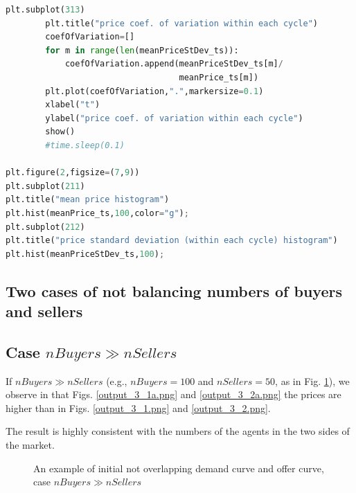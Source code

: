 \documentclass[12pt]{report}
\begin{document}
\begin{lstlisting}[language=Python, caption=The unstructured version, basicstyle=\ttfamily\footnotesize]
        plt.subplot(313)
        plt.title("price coef. of variation within each cycle")
        coefOfVariation=[]
        for m in range(len(meanPriceStDev_ts)):
            coefOfVariation.append(meanPriceStDev_ts[m]/
                                   meanPrice_ts[m])
        plt.plot(coefOfVariation,".",markersize=0.1)
        xlabel("t")
        ylabel("price coef. of variation within each cycle")
        show()
        #time.sleep(0.1)

plt.figure(2,figsize=(7,9))
plt.subplot(211)
plt.title("mean price histogram")
plt.hist(meanPrice_ts,100,color="g");
plt.subplot(212)
plt.title("price standard deviation (within each cycle) histogram")
plt.hist(meanPriceStDev_ts,100);
\end{lstlisting}




\begin{appendices}
\section{Two cases of not balancing numbers of buyers and sellers}\label{Two cases of not balancing numbers of buyers and sellers}
\thispagestyle{fancy}

\subsection{Case $nBuyers \gg nSellers$}
If $nBuyers \gg nSellers$ (e.g., $nBuyers=100$ and $nSellers=50$, as in Fig. \ref{output_2_1a.png}), we observe in that Figs. \ref{output_3_1a.png} and \ref{output_3_2a.png} the prices are higher than in Figs. \ref{output_3_1.png} and \ref{output_3_2.png}.

The result is highly consistent with the numbers of the agents in the two sides of the market.

\begin{figure}[htbp]
\begin{center}
\caption{An example of initial not overlapping demand curve and offer curve, case $nBuyers \gg nSellers$}
\label{output_2_1a.png}
\end{center}
\end{figure}


\end{appendices}
\end{document}

